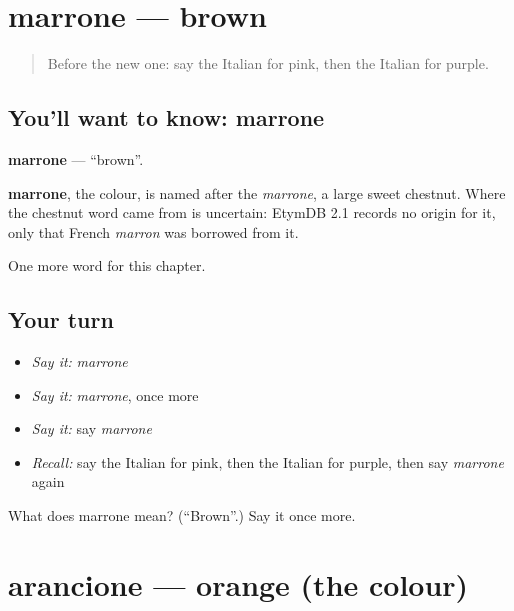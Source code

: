 \section[marrone]{marrone — brown}

\label{lesson:IT-C123-marrone}



\begin{quote}
Before the new one: say the Italian for pink, then the Italian for purple.
\end{quote}

\subsection*{You'll want to know: marrone}
\textbf{marrone} — \textquotedblleft{}brown\textquotedblright{}.

\begin{cousinweb}
\textbf{marrone}, the colour, is named after the \emph{marrone}, a large sweet chestnut. Where the chestnut word came from is uncertain: EtymDB 2.1 records no origin for it, only that French \emph{marron} was borrowed from it.
\end{cousinweb}

\begin{grammarlens}[title={What you've built}]
One more word for this chapter.
\end{grammarlens}

\subsection*{Your turn}
\begin{itemize}
\raggedright
  \item \emph{Say it:} \emph{marrone}
  \item \emph{Say it:} \emph{marrone}, once more
  \item \emph{Say it:} say \emph{marrone}
  \item \emph{Recall:} say the Italian for pink, then the Italian for purple, then say \emph{marrone} again
\end{itemize}

\begin{tcolorbox}[breakable,colback=teal!4,colframe=teal!35!black,title={Before you move on}]
What does marrone mean? (\textquotedblleft{}Brown\textquotedblright{}.) Say it once more.
\end{tcolorbox}
\section[arancione]{arancione — orange (the colour)}

